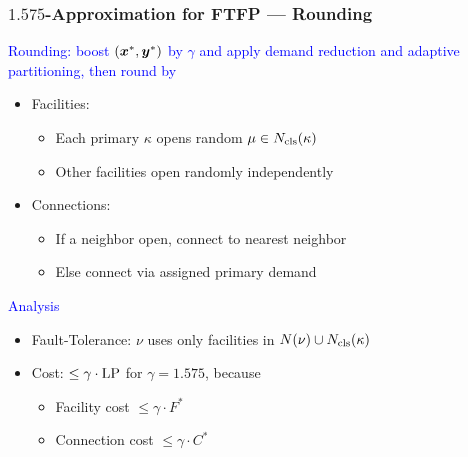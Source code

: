 \documentclass[hyperref,dvipsnames,svgnames,compress]{beamer}
\begin{document}
\begin{frame}
\frametitle{$1.575$-Approximation for FTFP --- Rounding}

{\large \textcolor{blue}{Rounding: boost
    $(\boldsymbol{x}^\ast,\boldsymbol{y}^\ast)$ by $\gamma$ and apply demand reduction and adaptive partitioning, then round by}

  	\begin{itemize}
  	  	\item  \textcolor{Sepia}{Facilities:} 
			\begin{itemize}
				\item Each primary $\kappa$ opens random $\mu\in N_{{\mbox{\scriptsize\rm cls}}}(\kappa)$
				\item Other facilities open randomly independently
			\end{itemize}
	  	\item \textcolor{Sepia}{Connections:} 
	 		\begin{itemize}
					\item If a neighbor open, connect to nearest neighbor
					\item Else connect via assigned primary demand
			\end{itemize}
  	\end{itemize}

\textcolor{blue}{Analysis}

  \begin{itemize}
  	\item \textcolor{Sepia}{Fault-Tolerance:} $\nu$ uses only facilities in
	    $N(\nu) \cup N_{{\mbox{\scriptsize\rm cls}}}(\kappa)$
	
  	\item \textcolor{Sepia}{Cost:} $\le \gamma\cdot\mbox{\rm LP}$ for $\gamma = 1.575$, because
    \begin{itemize}
    \item Facility cost $ \leq \gamma\cdot F^\ast$
    \item Connection cost $ \leq \gamma\cdot C^\ast$
    \end{itemize}
\end{itemize}
}

\end{frame}


\end{document}
